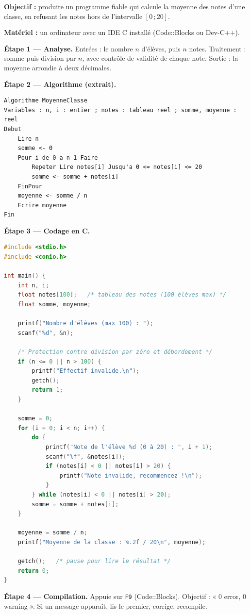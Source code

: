 \documentclass[11pt]{article}
\begin{document}
\begin{experience}
\textbf{Objectif :} produire un programme fiable qui calcule la moyenne des notes d'une classe, en refusant les notes hors de l'intervalle $[0\,;20]$.

\textbf{Matériel :} un ordinateur avec un IDE C installé (Code::Blocks ou Dev-C++).

\textbf{Étape 1 — Analyse.} Entrées : le nombre $n$ d'élèves, puis $n$ notes. Traitement : somme puis division par $n$, avec contrôle de validité de chaque note. Sortie : la moyenne arrondie à deux décimales.

\textbf{Étape 2 — Algorithme (extrait).}
\begin{lstlisting}
Algorithme MoyenneClasse
Variables : n, i : entier ; notes : tableau reel ; somme, moyenne : reel
Debut
    Lire n
    somme <- 0
    Pour i de 0 a n-1 Faire
        Repeter Lire notes[i] Jusqu'a 0 <= notes[i] <= 20
        somme <- somme + notes[i]
    FinPour
    moyenne <- somme / n
    Ecrire moyenne
Fin
\end{lstlisting}

\textbf{Étape 3 — Codage en C.}
\begin{lstlisting}[language=C]
#include <stdio.h>
#include <conio.h>

int main() {
    int n, i;
    float notes[100];   /* tableau des notes (100 élèves max) */
    float somme, moyenne;

    printf("Nombre d'élèves (max 100) : ");
    scanf("%d", &n);

    /* Protection contre division par zéro et débordement */
    if (n <= 0 || n > 100) {
        printf("Effectif invalide.\n");
        getch();
        return 1;
    }

    somme = 0;
    for (i = 0; i < n; i++) {
        do {
            printf("Note de l'élève %d (0 à 20) : ", i + 1);
            scanf("%f", &notes[i]);
            if (notes[i] < 0 || notes[i] > 20) {
                printf("Note invalide, recommencez !\n");
            }
        } while (notes[i] < 0 || notes[i] > 20);
        somme = somme + notes[i];
    }

    moyenne = somme / n;
    printf("Moyenne de la classe : %.2f / 20\n", moyenne);

    getch();   /* pause pour lire le résultat */
    return 0;
}
\end{lstlisting}

\textbf{Étape 4 — Compilation.} Appuie sur \texttt{F9} (Code::Blocks). Objectif : « 0 error, 0 warning ». Si un message apparaît, lis le premier, corrige, recompile.


\end{experience}
\end{document}
